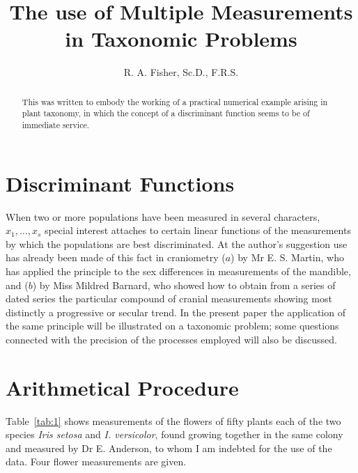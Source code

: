 \documentclass[12pt]{article}
\title{The use of Multiple Measurements in Taxonomic Problems}
\author{R. A. Fisher, Sc.D., F.R.S.}
\date{}
\begin{document}
\maketitle

\begin{abstract}
This was written to embody the working of a practical numerical example arising in plant taxonomy, in which the concept of a discriminant function seems to be of immediate service.\end{abstract}

\section{Discriminant Functions}

When two or more populations have been measured in several characters, $x_1, \dots, x_s$ special interest attaches to certain linear functions of the measurements by which the populations are best discriminated. At the author's suggestion use has already been made of this fact in craniometry ($a$) by Mr E. S. Martin, who has applied the principle to the sex differences in measurements of the mandible, and ($b$) by Miss Mildred Barnard, who showed how to obtain from a series of dated series the particular compound of cranial measurements showing most distinctly a progressive or secular trend. In the present paper the application of the same principle will be illustrated on a taxonomic problem; some questions connected with the precision of the processes employed will also be discussed.

\section{Arithmetical Procedure}

Table~\ref{tab:1} shows measurements of the flowers of fifty plants each of the two species \textit{Iris setosa} and \textit{I. versicolor}, found growing together in the same colony and measured by Dr E. Anderson, to whom I am indebted for the use of the data. Four flower measurements are given.
\end{document}
